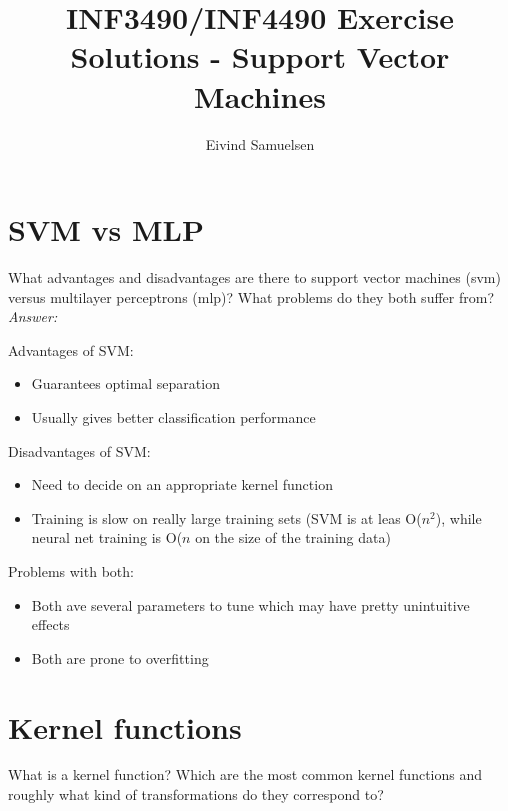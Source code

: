 
\title{\vspace{-2cm}INF3490/INF4490 Exercise Solutions - Support Vector Machines}
\author{Eivind Samuelsen}
\date{}

\setlength\parindent{0pt}


    \renewcommand\marginsymbol[1][0pt]{%
  \tabto*{0cm}\makebox[-1cm][c]{$\mathbb{P}$}\tabto*{\TabPrevPos}}

\maketitle


\section{SVM vs MLP}
What advantages and disadvantages are there to support vector machines (svm) versus multilayer perceptrons (mlp)?
What problems do they both suffer from?\\

\textit{Answer:}

Advantages of SVM:
\begin{itemize}
    \item Guarantees optimal separation
    \item Usually gives better classification performance
\end{itemize}
Disadvantages of SVM:
\begin{itemize}
    \item Need to decide on an appropriate kernel function
    \item Training is slow on really large training sets (SVM is at leas O(\(n^2\)), while neural net training is O(\(n\) on the size of the training data)
\end{itemize}
Problems with both:
\begin{itemize}
    \item Both ave several parameters to tune which may have pretty unintuitive effects
    \item Both are prone to overfitting
\end{itemize}

\section{Kernel functions}
What is a kernel function?
Which are the most common kernel functions and roughly what kind of transformations do they correspond to?\\

